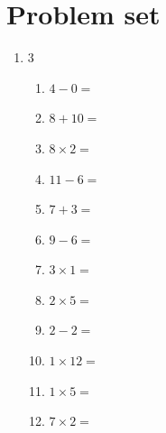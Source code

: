 \documentclass{tufte-book}
\begin{document}
\clearpage\section{Problem set }
\begin{enumerate}
\item
  \begin{multicols}{3}
  \begin{enumerate}
        \item $4 - 0=$ \dotfill\bigskip
        \item $8 + 10=$ \dotfill\bigskip
        \item $8 \times 2=$ \dotfill\bigskip
        \item $11 - 6=$ \dotfill
        \item $7 + 3=$ \dotfill\bigskip
        \item $9 - 6=$ \dotfill\bigskip
        \item $3 \times 1=$ \dotfill\bigskip
        \item $2 \times 5=$ \dotfill
        \item $2 - 2=$ \dotfill\bigskip
        \item $1 \times 12=$ \dotfill\bigskip
        \item $1 \times 5=$ \dotfill\bigskip
        \item $7 \times 2=$ \dotfill
  \end{enumerate}
  \end{multicols}


\end{enumerate}
\end{document}
